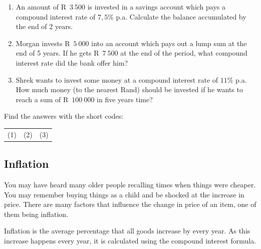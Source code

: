 \begin{exercises}{}{
    \begin{enumerate}[label=\textbf{\arabic*}.]
	\item An amount of R~$3~500$ is invested in a savings account which pays a compound interest rate of $7,5\%$ p.a. Calculate the balance accumulated by the end of 2 years.

	\item Morgan invests R~$5~000$ into an account which pays out a lump sum at the end of 5 years. If he gets R~$7~500$ at the end of the period, what compound interest rate did the bank offer him?

	\item Shrek wants to invest some money at a compound interest rate of $11\%$ p.a. How much money (to the nearest Rand) should be invested if he wants to reach a sum of R~$100~000$ in five years time?\\
    \end{enumerate}

    Find the answers with the short codes:\\
    \begin{tabularx}{\textwidth}{ XXX }
	(1)	&	(2)	&	(3)\\
    \end{tabularx}
}
\end{exercises}


\subsection{Inflation}

You may have heard many older people recalling times when things were cheaper. You may remember buying things as a child and be shocked at the increase in price. There are many factors that influence the change in price of an item, one of them being inflation.\par

Inflation is the average percentage that all goods increase by every year. As this increase happens every year, it is calculated using the compound interest formula.



